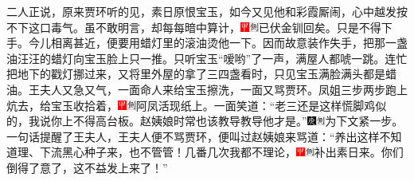 二人正说，原来贾环听的见，素日原恨宝玉，如今又见他和彩霞厮闹，心中越发按不下这口毒气。虽不敢明言，却每每暗中算计，{\includegraphics[width=3mm]{../Images/00002}\includegraphics[width=3mm]{../Images/00011}\footnotesize \kaishu 已伏金钏回矣。}只是不得下手。今儿相离甚近，便要用蜡灯里的滚油烫他一下。因而故意装作失手，把那一盏油汪汪的蜡灯向宝玉脸上只一推。只听宝玉“嗳哟”了一声，满屋人都唬一跳。连忙把地下的戳灯挪过来，又将里外屋的拿了三四盏看时，只见宝玉满脸满头都是蜡油。王夫人又急又气，一面命人来给宝玉擦洗，一面又骂贾环。凤姐三步两步跑上炕去，给宝玉收拾着，{\includegraphics[width=3mm]{../Images/00002}\includegraphics[width=3mm]{../Images/00011}\footnotesize \kaishu 阿凤活现纸上。}一面笑道：“老三还是这样慌脚鸡似的，我说你上不得高台板。赵姨娘时常也该教导教导他才是。”{\includegraphics[width=3mm]{../Images/00004}\includegraphics[width=3mm]{../Images/00011}\footnotesize \kaishu 为下文紧一步。}一句话提醒了王夫人，王夫人便不骂贾环，便叫过赵姨娘来骂道：“养出这样不知道理、下流黑心种子来，也不管管！几番几次我都不理论，{\includegraphics[width=3mm]{../Images/00002}\includegraphics[width=3mm]{../Images/00011}\footnotesize \kaishu 补出素日来。}你们倒得了意了，这不益发上来了！”

